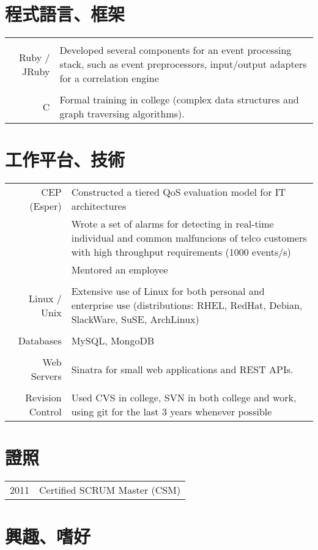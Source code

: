 \documentclass[a4paper,10pt]{article}
\begin{document}
\section{程式語言、框架}
\begin{tabular}{r|p{11cm}}
\multicolumn{2}{c}{} \\
Ruby / JRuby & Developed several components for an event processing stack, such
as event preprocessors, input/output adapters for a correlation engine \\
\multicolumn{2}{c}{} \\
C &  Formal training in college (complex data structures and graph traversing algorithms).\\
\end{tabular}

\section{工作平台、技術}
\begin{tabular}{r|p{11cm}}
CEP (Esper) & Constructed a tiered QoS evaluation model for IT architectures \\
 & Wrote a set of alarms for detecting in real-time individual and common malfuncions of
 telco customers with high throughput requirements (1000 events/s)\\
 & Mentored an employee \\
\multicolumn{2}{c}{} \\
Linux / Unix &  Extensive use of Linux for both personal and enterprise use (distributions: RHEL, RedHat, Debian, SlackWare, SuSE, ArchLinux) \\
\multicolumn{2}{c}{} \\
Databases & MySQL, MongoDB\\
\multicolumn{2}{c}{} \\
Web Servers & Sinatra for small web applications and REST APIs.\\
\multicolumn{2}{c}{} \\
Revision Control & Used CVS in college, SVN in both college and work, using git for the last 3 years whenever possible\\
\end{tabular}

\section{證照}
\begin{tabular}{rl}
 2011 & Certified SCRUM Master (\textsc{CSM}) \\
\end{tabular}

\section{興趣、嗜好}
\end{document}
